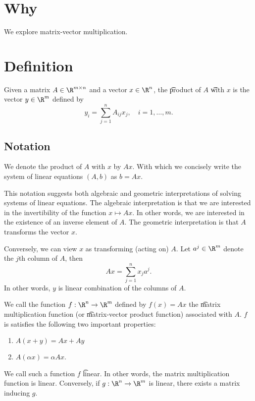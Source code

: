
\section*{Why}

We explore matrix-vector multiplication.

\section*{Definition}

Given a matrix $A \in \R ^{m \times n}$ and a vector $x \in \R ^{n}$, the \t{product} of $A$ \t{with} $x$ is the vector $y \in \R ^{m}$ defined by
  \[
y_i = \sum_{j = 1}^{n} A_{ij} x_j, \quad i = 1, \dots , m.
  \]

\subsection*{Notation}

We denote the product of $A$ with $x$ by $Ax$.
With which we concisely write the system of linear equations $(A, b)$ as $b = Ax$.

This notation suggests both algebraic and geometric interpretations of solving systems of linear equations.
The algebraic interpretation is that we are interested in the invertibility of the function $x \mapsto Ax$.
In other words, we are interested in the existence of an inverse element of $A$.
The geometric interpretation is that $A$ transforms the vector $x$.

Conversely, we can view $x$ as transforming (acting on) $A$.
Let $a^j \in \R ^m$ denote the $j$th column of $A$, then
  \[
Ax = \sum_{j = 1}^{n} x_j a^j.
  \]
In other words, $y$ is linear combination of the columns of $A$.

We call the function $f: \R ^n \to \R ^m$ defined by $f(x) = Ax$ the \t{matrix multiplication function} (or \t{matrix-vector product function}) associated with $A$.
$f$ is satisfies the following two important properties:
  \begin{enumerate}
  \item $A(x + y) = Ax + Ay$
  \item $A(\alpha x) = \alpha Ax$.
  \end{enumerate}
We call such a function $f$ \t{linear}.
In other words, the matrix multiplication function is linear.
Conversely, if $g: \R ^n \to \R ^m$ is linear, there exists a matrix inducing $g$.

